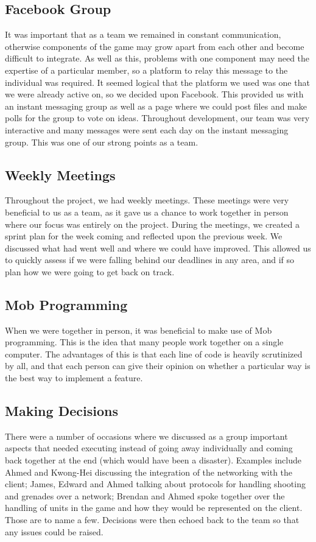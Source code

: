 \documentclass[12pt]{article}
\begin{document}
\subsection{Facebook Group}
It was important that as a team we remained in constant communication, otherwise components of the game may grow apart from each other and become difficult to integrate. As well as this, problems with one component may need the expertise of a particular member, so a platform to relay this message to the individual was required. It seemed logical that the platform we used was one that we were already active on, so we decided upon Facebook. This provided us with an instant messaging group as well as a page where we could post files and make polls for the group to vote on ideas. Throughout development, our team was very interactive and many messages were sent each day on the instant messaging group. This was one of our strong points as a team.
\subsection{Weekly Meetings}
Throughout the project, we had weekly meetings. These meetings were very beneficial to us as a team, as it gave us a chance to work together in person where our focus was entirely on the project. During the meetings, we created a sprint plan for the week coming and reflected upon the previous week. We discussed what had went well and where we could have improved. This allowed us to quickly assess if we were falling behind our deadlines in any area, and if so plan how we were going to get back on track.
\subsection{Mob Programming}
When we were together in person, it was beneficial to make use of Mob programming. This is the idea that many people work together on a single computer. The advantages of this is that each line of code is heavily scrutinized by all, and that each person can give their opinion on whether a particular way is the best way to implement a feature.
\subsection{Making Decisions}
There were a number of occasions where we discussed as a group important aspects that needed executing instead of going away individually and coming back together at the end (which would have been a disaster). Examples include Ahmed and Kwong-Hei discussing the integration of the networking with the client; James, Edward and Ahmed talking about protocols for handling shooting and grenades over a network; Brendan and Ahmed spoke together over the handling of units in the game and how they would be represented on the client. Those are to name a few. Decisions were then echoed back to the team so that any issues could be raised.
\newpage
\end{document}
